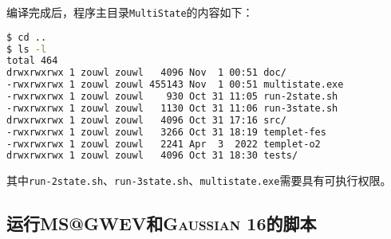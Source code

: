 \documentclass[UTF8]{ctexart}
\begin{document}
编译完成后，程序主目录\verb|MultiState|的内容如下：
\begin{lstlisting}[language=bash,numbers=none,backgroundcolor=\color{black},basicstyle=\tt\small\color{white},
alsoletter={.-},deletekeywords={cd},
classoffset=0,morekeywords={run-2state.sh, run-3state.sh, multistate.exe},keywordstyle=\color{green},
classoffset=1,morekeywords={doc, src, tests},keywordstyle=\color{blue!50!white},
classoffset=0]
$ cd ..
$ ls -l
total 464
drwxrwxrwx 1 zouwl zouwl   4096 Nov  1 00:51 doc/
-rwxrwxrwx 1 zouwl zouwl 455143 Nov  1 00:51 multistate.exe
-rwxrwxrwx 1 zouwl zouwl    930 Oct 31 11:05 run-2state.sh
-rwxrwxrwx 1 zouwl zouwl   1130 Oct 31 11:06 run-3state.sh
drwxrwxrwx 1 zouwl zouwl   4096 Oct 31 17:16 src/
-rwxrwxrwx 1 zouwl zouwl   3266 Oct 31 18:19 templet-fes
-rwxrwxrwx 1 zouwl zouwl   2241 Apr  3  2022 templet-o2
drwxrwxrwx 1 zouwl zouwl   4096 Oct 31 18:30 tests/
\end{lstlisting}
其中\verb|run-2state.sh|、\verb|run-3state.sh|、\verb|multistate.exe|需要具有可执行权限。

\subsection{运行MS@GWEV和\textsc{Gaussian} 16的脚本}
\end{document}
